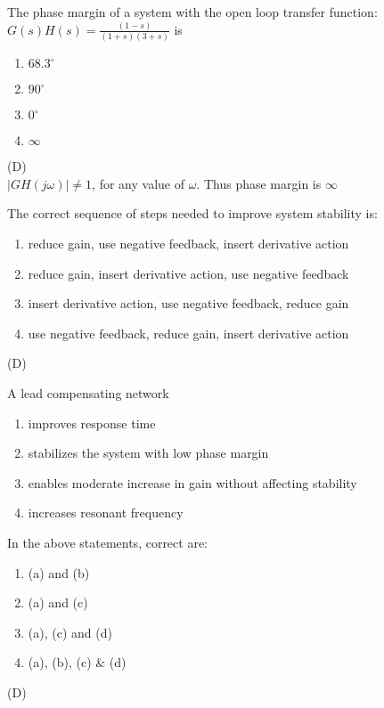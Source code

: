 \documentclass[a4paper]{exam}
\begin{document}
\begin{questions}
\question
The phase margin of a system with the open loop transfer function:\\
$\displaystyle G(s)H(s)=\frac{(1-s)}{(1+s)(3+s)}$ is
\begin{enumerate}[label=(\Alph*)]
\item $68.3^{\circ}$
\item $90^{\circ}$
\item $0^{\circ}$
\item $\infty$
\end{enumerate}
\begin{solution}
(D)\\
$|{GH(j\omega)|\neq 1}$, for any value of $\omega$. Thus phase margin is $\infty$
\end{solution}

\question
The correct sequence of steps needed to improve system stability is:
\begin{enumerate}[label=(\Alph*)]
\item reduce gain, use negative feedback, insert derivative action
\item reduce gain, insert derivative action, use negative feedback
\item insert derivative action, use negative feedback, reduce gain
\item use negative feedback, reduce gain, insert derivative action
\end{enumerate}
\begin{solution}
(D)
\end{solution}

\question
A lead compensating network
\begin{enumerate}[label=(\alph*)]
\item improves response time
\item stabilizes the system with low phase margin
\item enables moderate increase in gain without affecting stability
\item increases resonant frequency
\end{enumerate}
In the above statements, correct are:
\begin{enumerate}[label=(\Alph*)]
\item (a) and (b)
\item (a) and (c)
\item (a), (c) and (d)
\item (a), (b), (c) \& (d)
\end{enumerate}
\begin{solution}
(D)
\end{solution}


\end{questions}
\end{document}

